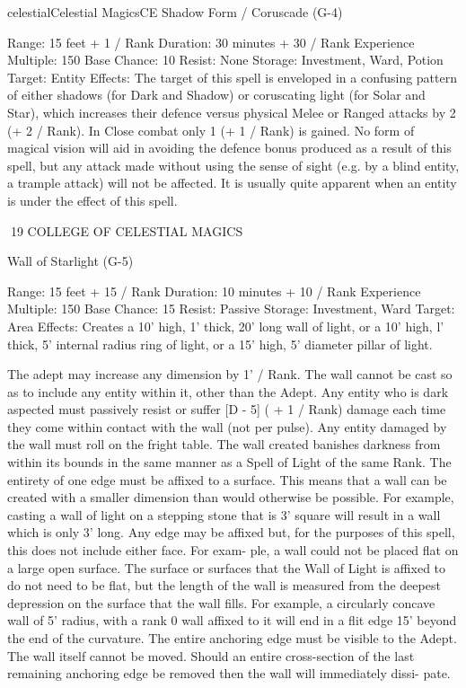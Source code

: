 \begin{College}[1.3]{celestial}{Celestial Magics}{CE}
Shadow Form / Coruscade (G-4) 

Range: 15 feet + 1 / Rank 
Duration: 30 minutes + 30 / Rank 
Experience Multiple: 150 
Base Chance: 10%
Resist: None 
Storage: Investment, Ward, Potion 
Target: Entity 
Effects:  The  target  of  this  spell  is  enveloped  in  a 
confusing  pattern  of  either  shadows  (for  Dark  and 
Shadow)  or  coruscating  light  (for  Solar  and  Star), 
which  increases  their  defence  versus  physical 
Melee  or  Ranged  attacks  by  2  (+  2  /  Rank).  In 
Close  combat  only  1  (+  1  /  Rank)  is  gained.  No 
form  of  magical  vision  will  aid  in  avoiding  the 
defence bonus produced as a result of this spell, but 
any  attack  made  without  using  the  sense  of  sight 
(e.g. by a blind entity, a trample attack) will not be 
affected. It is usually quite apparent when an entity 
is under the effect of this spell. 

19 COLLEGE OF CELESTIAL MAGICS 

Wall of Starlight (G-5) 

Range: 15 feet + 15 / Rank 
Duration: 10 minutes + 10 / Rank 
Experience Multiple: 150 
Base Chance: 15%
Resist: Passive 
Storage: Investment, Ward 
Target: Area 
Effects: Creates a 10’ high, 1’ thick, 20’ long wall 
of  light,  or  a  10’  high,  l’  thick,  5’  internal  radius 
ring  of  light,  or  a  15’  high,  5’  diameter  pillar  of 
light. 

The  adept  may  increase  any  dimension  by  1’  / 
Rank. The wall cannot be cast so as to include any 
entity  within  it,  other  than  the  Adept.  Any  entity 
who is dark aspected must passively resist or suffer 
[D - 5] ( + 1 / Rank) damage each time they come 
within  contact  with  the  wall  (not  per  pulse).  Any 
entity  damaged by  the  wall  must  roll  on  the  fright 
table.  The  wall  created  banishes  darkness  from 
within its bounds in the same manner as a Spell of 
Light  of  the  same  Rank.  The  entirety  of  one  edge 
must be affixed to a surface. This means that a wall 
can  be  created  with  a  smaller  dimension  than 
would otherwise be possible. For  example, casting 
a wall of light on a stepping stone that is 3’ square 
will  result  in  a  wall  which  is  only  3’  long.  Any 
edge  may  be  affixed  but,  for  the  purposes  of  this 
spell,  this  does  not  include  either  face.  For  exam-
ple, a wall could not be placed flat on a large open 
surface.  The  surface  or  surfaces  that  the  Wall  of 
Light  is  affixed  to  do  not  need  to  be  flat,  but  the 
length  of  the  wall  is  measured  from  the  deepest 
depression  on  the  surface  that  the  wall  fills.  For 
example,  a  circularly  concave  wall  of  5’  radius, 
with  a  rank  0  wall  affixed  to  it  will  end  in  a  flit 
edge  15’  beyond  the  end  of  the  curvature.  The 
entire anchoring edge must be visible to the Adept. 
The  wall  itself  cannot  be  moved.  Should  an  entire 
cross-section  of  the  last  remaining  anchoring  edge 
be  removed  then  the  wall  will  immediately  dissi-
pate. 


\end{College}
